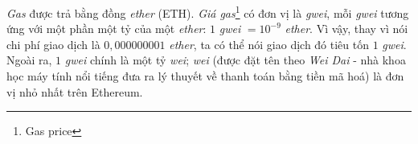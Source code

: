 \textit{Gas} được trả bằng đồng \textit{ether} (ETH). \textit{Giá gas}\footnote{Gas price} có đơn vị là \textit{gwei}, mỗi \textit{gwei} tương ứng với một phần một tỷ của một \textit{ether}: $1$ \textit{gwei} $=10^{-9}$ \textit{ether}. Vì vậy, thay vì nói chi phí giao dịch là $0,000000001$ \textit{ether}, ta có thể nói giao dịch đó tiêu tốn $1$ \textit{gwei}. Ngoài ra, $1$ \textit{gwei} chính là một tỷ \textit{wei}; \textit{wei} (được đặt tên theo \textit{Wei Dai} - nhà khoa học máy tính nổi tiếng đưa ra lý thuyết về thanh toán bằng tiền mã hoá) là đơn vị nhỏ nhất trên Ethereum.\\

